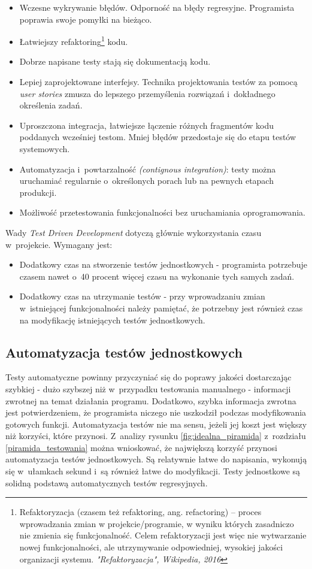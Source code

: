 \begin{itemize}
\item
Wczesne wykrywanie błędów. Odporność na błędy regresyjne. Programista poprawia swoje pomyłki na bieżąco.
\item
Łatwiejszy refaktoring\footnote{Refaktoryzacja (czasem też refaktoring, ang. refactoring) – proces wprowadzania zmian w projekcie/programie, w wyniku których zasadniczo nie zmienia się funkcjonalność. Celem refaktoryzacji jest więc nie wytwarzanie nowej funkcjonalności, ale utrzymywanie odpowiedniej, wysokiej jakości organizacji systemu.  \textit{"Refaktoryzacja", Wikipedia, 2016}} kodu.
\item
Dobrze napisane testy stają się dokumentacją kodu.
\item
Lepiej zaprojektowane interfejsy. Technika projektowania testów za pomocą \textit{user stories} zmusza do lepszego przemyślenia rozwiązań i~dokładnego określenia zadań. 
\item
Uproszczona integracja, łatwiejsze łączenie różnych fragmentów kodu poddanych wcześniej testom. Mniej błędów przedostaje się do etapu testów systemowych.
\item
Automatyzacja i~powtarzalność \textit{(contignous integration)}: testy można uruchamiać regularnie o~określonych porach lub na pewnych etapach produkcji. 
\item
Możliwość przetestowania funkcjonalności bez uruchamiania oprogramowania.
\end{itemize}

Wady \textit{Test Driven Development} dotyczą głównie wykorzystania czasu w~projekcie. Wymagany jest:

\begin{itemize}
\item
Dodatkowy czas na stworzenie testów jednostkowych - programista potrzebuje czasem nawet o~40 procent więcej czasu na wykonanie tych samych zadań.
\item
Dodatkowy czas na utrzymanie testów - przy wprowadzaniu zmian w~istniejącej funkcjonalności należy pamiętać, że potrzebny jest również czas na modyfikację istniejących testów jednostkowych.
\end{itemize}

\subsection{Automatyzacja testów jednostkowych}
Testy automatyczne powinny przyczyniać się do poprawy jakości dostarczając szybkiej - dużo szybszej niż w~przypadku testowania manualnego - informacji zwrotnej na temat działania programu. Dodatkowo, szybka informacja zwrotna jest potwierdzeniem, że programista niczego nie uszkodził podczas modyfikowania gotowych funkcji.
Automatyzacja testów nie ma sensu, jeżeli jej koszt jest większy niż korzyści, które przynosi. Z~analizy rysunku \ref{fig:idealna_piramida} z~rozdziału \ref{piramida_testowania} można wnioskować, że największą korzyść przynosi automatyzacja testów jednostkowych. Są relatywnie łatwe do napisania, wykonują się w~ułamkach sekund i~są również łatwe do modyfikacji. Testy jednostkowe są solidną podstawą automatycznych testów regresyjnych.

